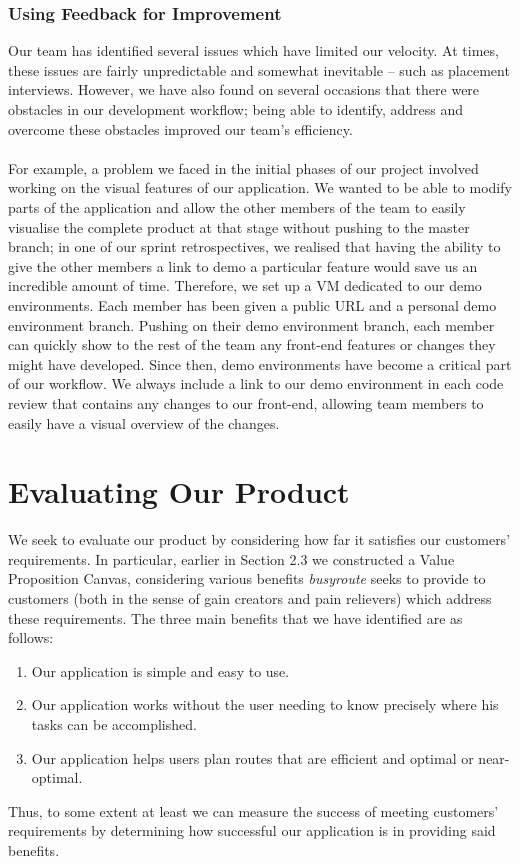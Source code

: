 \documentclass[a4paper, 10pt]{article}
\begin{document}
\subsubsection{Using Feedback for Improvement}
Our team has identified several issues which have limited our velocity. At times, these issues are fairly unpredictable and somewhat inevitable -- such as placement interviews. However, we have also found on several occasions that there were obstacles in our development workflow; being able to identify, address and overcome these obstacles improved our team's efficiency.\\\\
For example, a problem we faced in the initial phases of our project involved working on the visual features of our application. We wanted to be able to modify parts of the application and allow the other members of the team to easily visualise the complete product at that stage without pushing to the master branch; in one of our sprint retrospectives, we realised that having the ability to give the other members a link to demo a particular feature would save us an incredible amount of time. Therefore, we set up a VM dedicated to our demo environments. Each member has been given a public URL and a personal demo environment branch. Pushing on their demo environment branch, each member can quickly show to the rest of the team any front-end features or changes they might have developed. Since then, demo environments have become a critical part of our workflow. We always include a link to our demo environment in each code review that contains any changes to our front-end, allowing team members to easily have a visual overview of the changes.

\section{Evaluating Our Product}
We seek to evaluate our product by considering how far it satisfies our customers' requirements. In particular, earlier in Section 2.3 we constructed a Value Proposition Canvas, considering various benefits \textit{busyroute} seeks to provide to customers (both in the sense of gain creators and pain relievers) which address these requirements. The three main benefits that we have identified are as follows:
\begin{enumerate}
\item Our application is simple and easy to use.
\item Our application works without the user needing to know precisely where his tasks can be accomplished.
\item Our application helps users plan routes that are efficient and optimal or near-optimal.
\end{enumerate}
Thus, to some extent at least we can measure the success of meeting customers' requirements by determining how successful our application is in providing said benefits.
\end{document}
